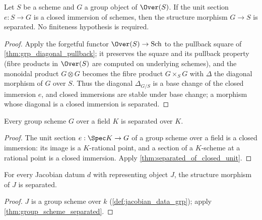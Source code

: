 \begin{theorem}
  \label{thm:separated_of_closed_unit}
  \leanok
  Let \(S\) be a scheme and \(G\) a group object of \(\Over(S)\). If the unit
  section \(e : S \to G\) is a closed immersion of schemes, then the structure
  morphism \(G \to S\) is separated. No finiteness hypothesis is required.
\end{theorem}
\begin{proof}
  \leanok
  Apply the forgetful functor \(\Over(S) \to \mathrm{Sch}\) to the pullback
  square of \ref{thm:grp_diagonal_pullback}; it preserves the square and its
  pullback property (fibre products in \(\Over(S)\) are computed on underlying
  schemes), and the monoidal product \(G \otimes G\) becomes the fibre product
  \(G \times_S G\) with \(\Delta\) the diagonal morphism of \(G\) over \(S\).
  Thus the diagonal \(\Delta_{G/S}\) is a base change of the closed immersion
  \(e\), and closed immersions are stable under base change; a morphism whose
  diagonal is a closed immersion is separated.
\end{proof}

\begin{theorem}
  \label{thm:group_scheme_separated}
  \leanok
  Every group scheme \(G\) over a field \(K\) is separated over \(K\).
\end{theorem}
\begin{proof}
  \leanok
  The unit section \(e : \Spec K \to G\) of a group scheme over a field is a
  closed immersion: its image is a \(K\)-rational point, and a section of a
  \(K\)-scheme at a rational point is a closed immersion. Apply
  \ref{thm:separated_of_closed_unit}.
\end{proof}

\begin{corollary}
  \label{cor:jacobianData_separated}
  \leanok
  For every Jacobian datum \(d\) with representing object \(J\), the structure
  morphism of \(J\) is separated.
\end{corollary}
\begin{proof}
  \leanok
  \(J\) is a group scheme over \(k\) (\ref{def:jacobian_data_grp}); apply
  \ref{thm:group_scheme_separated}.
\end{proof}

